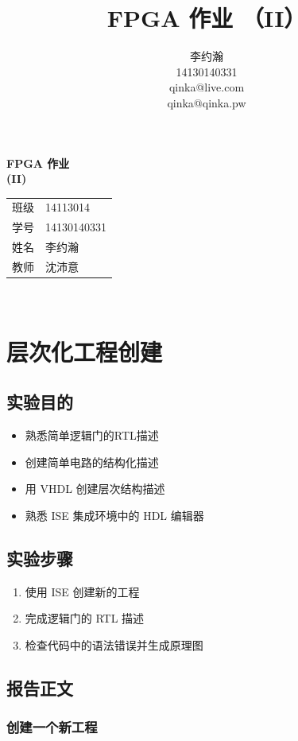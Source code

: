 \documentclass{ctexart}
\title{FPGA 作业 （II）}
\author{李约瀚 \\ 14130140331 \\ qinka@live.com \\ qinka@qinka.pw}
\begin{document}
\thispagestyle{empty}
\begin{center}
  \vspace*{4em}
  {\Huge\textbf{FPGA 作业 \\ \vspace*{0.5em} (II)}}
  \vfill
  \large
  \begin{tabular}{c@{:}l}
    班级 & 14113014 \\
    学号 & 14130140331 \\
    姓名 & 李约瀚 \\
    教师 & 沈沛意 \\
  \end{tabular}
  \vspace*{4em}\\
\end{center}
\newpage

\section{层次化工程创建}

\subsection{实验目的}
\begin{itemize}
\item 熟悉简单逻辑门的RTL描述
\item 创建简单电路的结构化描述
\item 用 VHDL 创建层次结构描述
\item 熟悉 ISE 集成环境中的 HDL 编辑器
\end{itemize}


\subsection{实验步骤}

\begin{enumerate}
\item 使用 ISE 创建新的工程
\item 完成逻辑门的 RTL 描述
\item 检查代码中的语法错误并生成原理图
\end{enumerate}


\subsection{报告正文}

\subsubsection{创建一个新工程}
\end{document}
